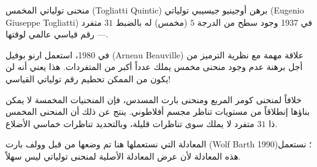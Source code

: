 \begin{surferPage}{منحنى تولياتي المخمس (Togliatti Quintic)}
    برهن أوجينيو جيسيبي تولياتي (Eugenio Giuseppe Togliatti) في 1937 وجود سطح من الدرجة $5$ (مخمس) له بالضبط $31$ متفرد--- رقم قياسي عالمي لوقتها.

    في 1980، استعمل ارنو بوفيل (Arneau Beauville) علاقة مهمة مع نظرية الترميز من أجل برهنة عدم وجود منحنى مخمس يملك عدداً أكبر من المتفردات. 
    هذا يعني أنه لن يكون من الممكن تحطيم رقم تولياتي القياسي! 

   خلافاً لمنحنى كومر المربع ومنحنى بارت المسدس، فإن المنحنيات المخمسة لا يمكن بناؤها إنطلاقاً من مستويات تناظر مجسم أفلاطوني. ينتج عن ذلك أن المنحنى المخمس ذا $31$ متفرد لا يملك سوى تناظرات قليلة، وبالتحديد تناظرات خماسي الأضلاع.
   
    المعادلة التي نستعملها هنا تم وضعها من قبل وولف بارت (Wolf Barth 1990)؛ نستعمل هذه المعادلة لأن عرض المعادلة الأصلية لمنحنى تولياتي ليس سهلاً. 
\end{surferPage}